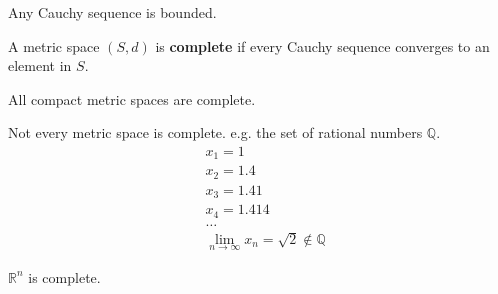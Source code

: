 \begin{lemma}
    Any Cauchy sequence is bounded. 
\end{lemma}

\begin{definition}[Complete]
    A metric space $(S,d)$ is \textbf{complete} if every Cauchy sequence converges to an element in $S$.
\end{definition}

\begin{proposition}
    All compact metric spaces are complete.
\end{proposition}

\begin{remark*}
    Not every metric space is complete. e.g. the set of rational numbers $\mathbb{Q}$.\begin{align*}
        &x_1 = 1 \\
        &x_2 = 1.4 \\
        &x_3 = 1.41 \\
        &x_4 = 1.414 \\
        & \dots \\
        &\lim_{n \to \infty} x_n = \sqrt{2} \notin \mathbb{Q}
    \end{align*}
\end{remark*}

\begin{proposition}
    $\mathbb{R}^{n}$ is complete.
\end{proposition}


